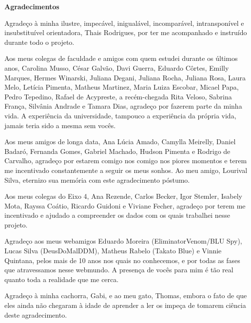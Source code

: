 \documentclass[12pt, a4paper, twoside]{article}
\numberwithin{equation}{subsection} %
\begin{document}


\vspace*{2.5cm}

\begin{center}
 {\Huge \bfseries Agradecimentos}
\end{center}
\baselineskip 19.5pt 
\vspace*{1.5cm}

Agradeço à minha ilustre, impecável, inigualável, incomparável, intransponível e insubstituível orientadora, Thais Rodrigues, por ter me acompanhado e instruído durante todo o projeto.

Aos meus colegas de faculdade e amigos com quem estudei durante os últimos anos, Carolina Musso, César Galvão, Davi Guerra, Eduardo Côrtes, Emilly Marques, Hermes Winarski, Juliana Degani, Juliana Rocha, Juliana Rosa, Laura Melo, Letícia Pimenta, Matheus Martinez, Maria Luiza Escobar, Micael Papa, Pedro Tepedino, Rafael de Acypreste, a recém-chegada Rita Veloso, Sabrina França, Silvânia Andrade e Tamara Dias, agradeço por fazerem parte da minha vida. A experiência da universidade, tampouco a experiência da própria vida, jamais teria sido a mesma sem vocês.

Aos meus amigos de longa data, Ana Lúcia Amado, Camylla Meirelly, Daniel Badaró, Fernanda Gomes, Gabriel Machado, Hudson Pimenta e Rodrigo de Carvalho, agradeço por estarem comigo nos comigo nos piores momentos e terem me incentivado constantemente a seguir os meus sonhos. Ao meu amigo, Lourival Silva,     eternizo sua memória com este agradecimento póstumo.

Aos meus colegas do Eixo 4, Ana Rezende, Carlos Becker, Igor Stemler, Isabely Mota, Rayssa Coátio, Ricardo Guidoni e Viviane Fecher, agradeço por terem me incentivado e ajudado a compreender os dados com os quais trabalhei nesse projeto. 

Agradeço aos meus webamigos Eduardo Moreira (EliminatorVenom/BLU Spy), Lucas Silva (DeusDoMalDDM), Matheus Rabelo (Takato Blue) e Vinnie Quintana, pelos mais de 10 anos nos quais no conhecemos, e por todas as fases que atravessamos nesse webmundo. A presença de vocês para mim é tão real quanto toda a realidade que me cerca.

Agradeço à minha cachorra, Gabi, e ao meu gato, Thomas, embora o fato de que eles ainda não chegaram à idade de aprender a ler os impeça de tomarem ciência deste agradecimento.
\end{document}
